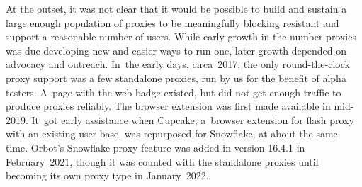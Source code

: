 \documentclass[letterpaper,twocolumn]{article}
\begin{document}
At the outset, it was not clear
that it would be possible to build and sustain
a large enough population of proxies
to be meaningfully blocking resistant
and support a reasonable number of users.
While early growth in the number proxies
was due developing new and easier ways to run one,
later growth depended on advocacy and outreach.
In~the early days, circa~2017,
the only round-the-clock proxy support was
a few standalone proxies,
run by us for the benefit of alpha testers.
A~page with the web badge existed,
but did not get enough traffic to produce proxies reliably.
The browser extension was first made available in mid-2019.
It~got early assistance when Cupcake,
a~browser extension for flash proxy with an existing user base,
was repurposed for Snowflake, at about the same time.
Orbot's Snowflake proxy feature was added in version 16.4.1 in February~2021,
though it was counted with the standalone proxies
until becoming its own proxy type in January~2022.
\end{document}
